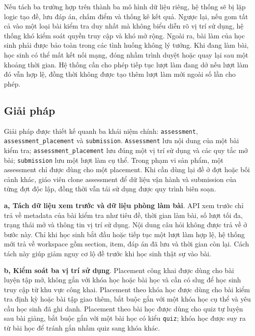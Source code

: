 \documentclass[../DoAn.tex]{subfiles}
\begin{document}
Nếu tách ba trường hợp trên thành ba mô hình dữ liệu riêng, hệ thống sẽ bị lặp logic tạo đề, lưu đáp án, chấm điểm và thống kê kết quả. Ngược lại, nếu gom tất cả vào một loại bài kiểm tra duy nhất mà không biểu diễn rõ vị trí sử dụng, hệ thống khó kiểm soát quyền truy cập và khó mở rộng. Ngoài ra, bài làm của học sinh phải được bảo toàn trong các tình huống không lý tưởng. Khi đang làm bài, học sinh có thể mất kết nối mạng, đóng nhầm trình duyệt hoặc quay lại sau một khoảng thời gian. Hệ thống cần cho phép tiếp tục lượt làm đang dở nếu lượt làm đó vẫn hợp lệ, đồng thời không được tạo thêm lượt làm mới ngoài số lần cho phép.

\subsection{Giải pháp}
\label{section:5.2.2}

Giải pháp được thiết kế quanh ba khái niệm chính: \texttt{assessment}, \texttt{assessment\_placement} và \texttt{submission}. \texttt{Assessment} lưu nội dung của một bài kiểm tra; \texttt{assessment\_placement} lưu đúng một vị trí sử dụng và các quy tắc mở bài; \texttt{submission} lưu một lượt làm cụ thể. Trong phạm vi sản phẩm, một assessment chỉ được dùng cho một placement. Khi cần dùng lại đề ở đợt hoặc bối cảnh khác, giáo viên clone assessment để dữ liệu vận hành và submission của từng đợt độc lập, đồng thời vẫn tái sử dụng được quy trình biên soạn.

\textbf{a, Tách dữ liệu xem trước và dữ liệu phòng làm bài}. API xem trước chỉ trả về metadata của bài kiểm tra như tiêu đề, thời gian làm bài, số lượt tối đa, trạng thái mở và thông tin vị trí sử dụng. Nội dung câu hỏi không được trả về ở bước này. Chỉ khi học sinh bắt đầu hoặc tiếp tục một lượt làm hợp lệ, hệ thống mới trả về workspace gồm section, item, đáp án đã lưu và thời gian còn lại. Cách tách này giúp giảm nguy cơ lộ đề trước khi học sinh thật sự vào bài.

\textbf{b, Kiểm soát ba vị trí sử dụng}. Placement công khai được dùng cho bài luyện tập mở, không gắn với khóa học hoặc bài học và cần có slug để học sinh truy cập từ khu vực công khai. Placement theo khóa học được dùng cho bài kiểm tra định kỳ hoặc bài tập giao thêm, bắt buộc gắn với một khóa học cụ thể và yêu cầu học sinh đã ghi danh. Placement theo bài học được dùng cho quiz tự luyện sau bài giảng, bắt buộc gắn với một bài học có kiểu \texttt{quiz}; khóa học được suy ra từ bài học để tránh gắn nhầm quiz sang khóa khác.
\end{document}

